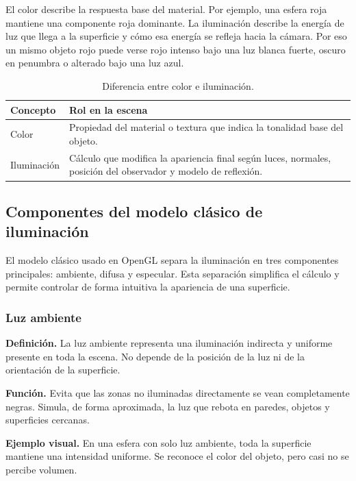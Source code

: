 \documentclass[a4paper,12pt]{article}
\begin{document}
El color describe la respuesta base del material. Por ejemplo, una esfera roja mantiene una componente roja dominante. La iluminación describe la energía de luz que llega a la superficie y cómo esa energía se refleja hacia la cámara. Por eso un mismo objeto rojo puede verse rojo intenso bajo una luz blanca fuerte, oscuro en penumbra o alterado bajo una luz azul.

\begin{table}[H]
\centering
\begin{tabular}{|p{}|p{}|}
\hline
\textbf{Concepto} & \textbf{Rol en la escena} \\
\hline
Color & Propiedad del material o textura que indica la tonalidad base del objeto. \\
\hline
Iluminación & Cálculo que modifica la apariencia final según luces, normales, posición del observador y modelo de reflexión. \\
\hline
\end{tabular}
\caption{Diferencia entre color e iluminación.}
\end{table}

\subsection{Componentes del modelo clásico de iluminación}

El modelo clásico usado en OpenGL separa la iluminación en tres componentes principales: ambiente, difusa y especular. Esta separación simplifica el cálculo y permite controlar de forma intuitiva la apariencia de una superficie.

\subsubsection{Luz ambiente}

\textbf{Definición.} La luz ambiente representa una iluminación indirecta y uniforme presente en toda la escena. No depende de la posición de la luz ni de la orientación de la superficie.

\textbf{Función.} Evita que las zonas no iluminadas directamente se vean completamente negras. Simula, de forma aproximada, la luz que rebota en paredes, objetos y superficies cercanas.

\textbf{Ejemplo visual.} En una esfera con solo luz ambiente, toda la superficie mantiene una intensidad uniforme. Se reconoce el color del objeto, pero casi no se percibe volumen.
\end{document}
